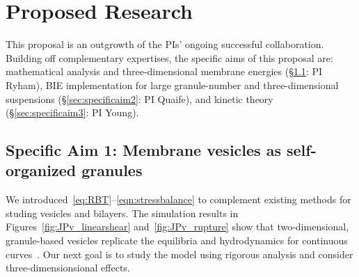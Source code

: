 \section{Proposed Research}
\label{sec:proposed-work}
This proposal is an outgrowth of the PIs' ongoing successful
collaboration. Building off complementary expertises, the specific aims
of this proposal are: mathematical analysis and three-dimensional
membrane energies (\S\ref{sec:specificaim1}: PI Ryham), BIE
implementation for large granule-number and three-dimensional
suspensions (\S\ref{sec:specificaim2}: PI Quaife), and kinetic theory
(\S\ref{sec:specificaim3}: PI Young).

\subsection{Specific Aim 1: Membrane vesicles as self-organized granules}
\label{sec:specificaim1}
We introduced~\eqref{eq:RBT}--\eqref{eqn:stressbalance} to complement
existing methods for studing vesicles and bilayers. The simulation
results in Figures~\ref{fig:JPv_linearshear} and~\ref{fig:JPv_rupture}
show that two-dimensional, granule-based vesicles replicate the
equilibria and hydrodynamics for continuous curves~\cite{FuQuRyYo22,
Fu2018_SIAM}. Our next goal is to study the model using rigorous
analysis and consider three-dimensionsional effects. 

